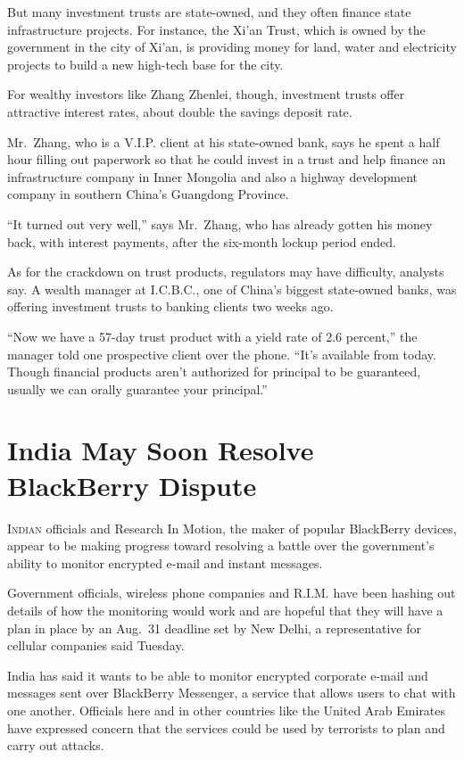 ﻿\documentclass[12pt]{article}
\begin{document}
But many investment trusts are state-owned, and they often finance state infrastructure projects.
For instance, the Xi'an Trust, which is owned by the government in the city of Xi'an, is providing
money for land, water and electricity projects to build a new high-tech base for the city.

For wealthy investors like Zhang Zhenlei, though, investment trusts offer attractive interest rates,
about double the savings deposit rate.

Mr.~Zhang, who is a V.I.P. client at his state-owned bank, says he spent a half hour filling out
paperwork so that he could invest in a trust and help finance an infrastructure company in Inner
Mongolia and also a highway development company in southern China's Guangdong Province.

``It turned out very well,'' says Mr.~Zhang, who has already gotten his money back, with interest
payments, after the six-month lockup period ended.

As for the crackdown on trust products, regulators may have difficulty, analysts say. A wealth
manager at I.C.B.C., one of China's biggest state-owned banks, was offering investment trusts to
banking clients two weeks ago.

``Now we have a 57-day trust product with a yield rate of 2.6 percent,'' the manager told one
prospective client over the phone. ``It's available from today. Though financial products aren't
authorized for principal to be guaranteed, usually we can orally guarantee your principal.''

\section{India May Soon Resolve BlackBerry Dispute}

\lettrine{I}{ndian} officials and Research In Motion, the maker of popular
BlackBerry devices, appear to be making progress toward resolving a battle over the government's
ability to monitor encrypted e-mail and instant messages.

Government officials, wireless phone companies and R.I.M. have been hashing out details of how the
monitoring would work and are hopeful that they will have a plan in place by an Aug.~31 deadline set
by New Delhi, a representative for cellular companies said Tuesday.

India has said it wants to be able to monitor encrypted corporate e-mail and messages sent over
BlackBerry Messenger, a service that allows users to chat with one another. Officials here and in
other countries like the United Arab Emirates have expressed concern that the services could be used
by terrorists to plan and carry out attacks.
\end{document}
